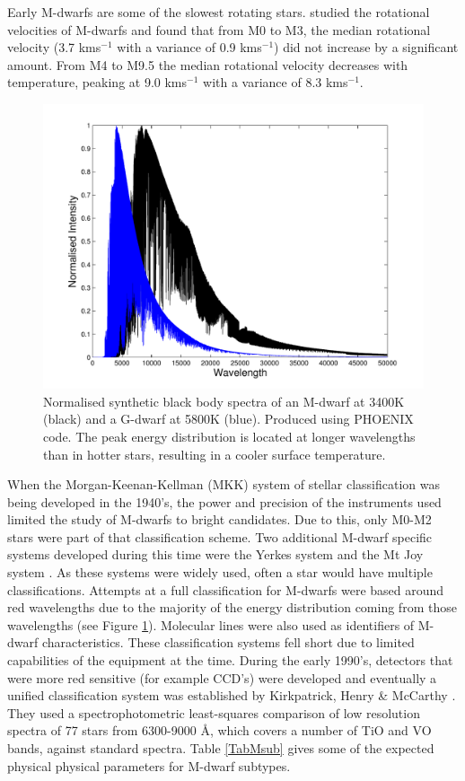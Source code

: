 Early M-dwarfs are some of the slowest rotating stars. \citet{2009Jenkins} studied the rotational velocities of M-dwarfs and found that from M0 to M3, the median rotational velocity (3.7 kms$^{-1}$ with a variance of 0.9 kms$^{-1}$) did not increase by a significant amount. From M4 to M9.5 the median rotational velocity decreases with temperature, peaking at 9.0 kms$^{-1}$ with a variance of 8.3 kms$^{-1}$.\\

\begin{figure}
\centering
\includegraphics[width=\textwidth]{synth.pdf}
\caption{Normalised synthetic black body spectra of an M-dwarf at 3400K (black) and a G-dwarf at 5800K (blue). Produced using PHOENIX code. The peak energy distribution is located at longer wavelengths than in hotter stars, resulting in a cooler surface temperature.}
\label{FigSynth}
\end{figure}
When the Morgan-Keenan-Kellman (MKK) system of stellar classification was being developed \citep{1943Morgan} in the 1940's, the power and precision of the instruments used limited the study of M-dwarfs to bright candidates. Due to this, only M0-M2 stars were part of that classification scheme. Two additional M-dwarf specific systems developed during this time were the Yerkes system \citep{1938Morgan,1942Kuiper} and the Mt Joy system \citep{1947Joy}. As these systems were widely used, often a star would have multiple classifications. Attempts at a full classification for M-dwarfs were based around red wavelengths due to the majority of the energy distribution coming from those wavelengths (see Figure \ref{FigSynth}). Molecular lines were also used as identifiers of M-dwarf characteristics. These classification systems fell short due to limited capabilities of the equipment at the time. During the early 1990's, detectors that were more red sensitive (for example CCD's) were developed and eventually a unified classification system was established by Kirkpatrick, Henry \& McCarthy \citep{1991Kirkpatrick}. They used a spectrophotometric least-squares comparison of low resolution spectra of 77 stars from 6300-9000 \AA, which covers a number of TiO and VO bands, against standard spectra. Table \ref{TabMsub} gives some of the expected physical physical parameters for M-dwarf subtypes.
